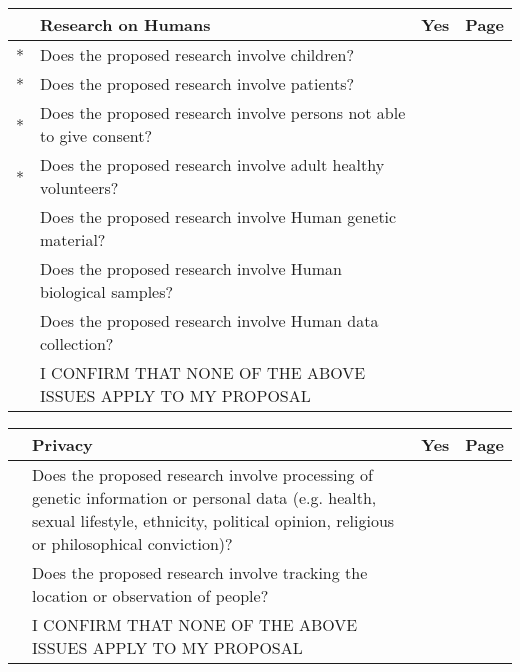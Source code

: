 \documentclass[a4paper,11pt]{article}
\begin{document}
\vspace{0.5cm}
\begin{tabularx}{\linewidth}{ | c | X | c | c | }
\rowcolor{black} & {\centering\arraybackslash \color{white} \bf Research on Humans} & {\color{white} \bf Yes} & {\color{white} \bf Page} \\ \hline
 * & Does the proposed research involve children?                         & & \\ \hline
 * & Does the proposed research involve patients?                         & & \\ \hline
 * & Does the proposed research involve persons not able to give consent? & & \\ \hline
 * & Does the proposed research involve adult healthy volunteers?         & & \\ \hline
   & Does the proposed research involve Human genetic material?           & & \\ \hline
   & Does the proposed research involve Human biological samples?         & & \\ \hline
   & Does the proposed research involve Human data collection?            & & \\ \hline
   & I CONFIRM THAT NONE OF THE ABOVE ISSUES APPLY TO MY PROPOSAL         & & \cellcolor[gray]{0.8}\\ \hline 
\end{tabularx}

\vspace{0.5cm}
\begin{tabularx}{\linewidth}{ | c | X | c | c | }
\rowcolor{black} & {\centering\arraybackslash \color{white} \bf Privacy} & {\color{white} \bf Yes} & {\color{white} \bf Page} \\ \hline
   & Does the proposed research involve processing of genetic information or personal data (e.g. health, sexual lifestyle, ethnicity, political opinion, religious or philosophical conviction)? & & \\ \hline
   & Does the proposed research involve tracking the location or observation of people? & & \\ \hline
   & I CONFIRM THAT NONE OF THE ABOVE ISSUES APPLY TO MY PROPOSAL & & \cellcolor[gray]{0.8}\\ \hline
\end{tabularx}
\end{document}
